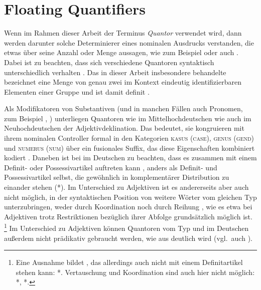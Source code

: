 \section{Floating Quantifiers}
\label{sec:floatquant}

Wenn im Rahmen dieser Arbeit der Terminus \textit{Quantor} verwendet wird, dann
werden darunter solche Determinierer eines nominalen Ausdrucks verstanden, die
etwas über seine Anzahl oder Menge aussagen, wie zum Beispiel  oder auch . Dabei ist zu beachten, dass sich verschiedene
Quantoren syntaktisch unterschiedlich verhalten
\autocites[27--28]{pittner1995}[11--12]{haspelmath1997}. Das in dieser Arbeit
insbesondere behandelte  bezeichnet eine Menge von genau zwei
im Kontext eindeutig identifizierbaren Elementen einer Gruppe
\autocite[vgl.][307]{keenan2006} und ist damit definit
\autocite[265--268]{lyons1999}.

Als Modifikatoren von Substantiven (und in manchen Fällen auch Pronomen, zum
Beispiel , ) unterliegen Quantoren wie
 im Mittelhochdeutschen wie auch 
im Neuhochdeutschen der Adjektivdeklination. Das bedeutet,
sie kongruieren mit ihrem nominalen Controller formal in den Kategorien
\textsc{kasus} (\textsc{case}), \textsc{genus} (\textsc{gend}) und
\textsc{numerus} (\textsc{num}) über ein fusionales Suffix, das diese
Eigenschaften kombiniert kodiert \autocites(vgl.~auch
, )[181--184]{ksw2}[772]{woellstein2022}.
Daneben ist bei  im Deutschen zu beachten, dass es zusammen mit einem
Definit- oder Possessivartikel auftreten kann , anders als
Definit- und Possessivartikel selbst, die gewöhnlich in komplementärer
Distribution zu einander stehen (*). Im Unterschied zu
Adjektiven ist es andererseits aber auch nicht möglich, in der syntaktischen
Position von  weitere Wörter vom gleichen Typ unterzubringen, weder
durch Koordination  noch durch Reihung
, wie es etwa bei Adjektiven trotz Restriktionen
bezüglich ihrer Abfolge grundsätzlich möglich ist.%
%
	\footnote{Eine Ausnahme bildet , das allerdings auch nicht
		mit einem Definitartikel stehen kann: *.
		Vertauschung und Koordination sind auch hier nicht möglich: *, *.%
	}
%
Im Unterschied zu Adjektiven können Quantoren vom Typ  und 
im Deutschen außerdem nicht prädikativ gebraucht werden, wie aus
 deutlich wird (vgl.~auch \cite[181,
Anm.~1]{merchant1996}).

